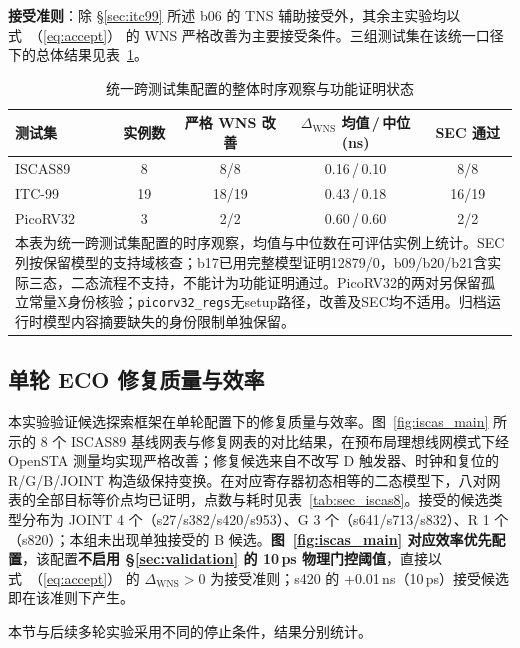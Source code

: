 \documentclass[twocolumn,10pt,fontset=windows]{ctexart}
\renewcommand{\eqref}[1]{\textup{（\ref{#1}）}}
\begin{document}
\textbf{接受准则}：除 \S\ref{sec:itc99} 所述 b06 的 TNS 辅助接受外，其余主实验均以式~\eqref{eq:accept} 的 WNS 严格改善为主要接受条件。三组测试集在该统一口径下的总体结果见表~\ref{tab:overview}。

\begin{table}[!htb]
\centering
\caption{统一跨测试集配置的整体时序观察与功能证明状态}
\label{tab:overview}
\scriptsize
\setlength{\tabcolsep}{3pt}
\begin{tabular}{lcccc}
\toprule
\textbf{测试集} & \textbf{实例数} & \textbf{严格 WNS 改善} & \textbf{$\Delta_{\mathrm{WNS}}$ 均值\,/\,中位 (ns)} & \textbf{SEC 通过} \\
\midrule
ISCAS89  & 8  & 8/8   & 0.16\,/\,0.10 & 8/8 \\
ITC-99   & 19 & 18/19 & 0.43\,/\,0.18 & 16/19 \\
PicoRV32 & 3  & 2/2   & 0.60\,/\,0.60 & 2/2 \\
\bottomrule
\multicolumn{5}{p{0.95\columnwidth}}{\footnotesize 本表为统一跨测试集配置的时序观察，均值与中位数在可评估实例上统计。SEC列按保留模型的支持域核查；b17已用完整模型证明12879/0，b09/b20/b21含实际三态，二态流程不支持，不能计为功能证明通过。PicoRV32的两对另保留孤立常量X身份核验；\texttt{picorv32\_regs}无setup路径，改善及SEC均不适用。归档运行时模型内容摘要缺失的身份限制单独保留。} \\
\end{tabular}
\end{table}

\subsection{单轮 ECO 修复质量与效率}\label{sec:iscas}

本实验验证候选探索框架在单轮配置下的修复质量与效率。图~\ref{fig:iscas_main} 所示的 8 个 ISCAS89 基线网表与修复网表的对比结果，在预布局理想线网模式下经 OpenSTA 测量均实现严格改善；修复候选来自不改写 D 触发器、时钟和复位的 R/G/B/JOINT 构造级保持变换。在对应寄存器初态相等的二态模型下，八对网表的全部目标等价点均已证明，点数与耗时见表~\ref{tab:sec_iscas8}。接受的候选类型分布为 JOINT 4 个（s27/s382/s420/s953）、G 3 个（s641/s713/s832）、R 1 个（s820）；本组未出现单独接受的 B 候选。\textbf{图~\ref{fig:iscas_main} 对应效率优先配置}\label{sec:eff_prio}，该配置\textbf{不启用 \S\ref{sec:validation} 的 10\,ps 物理门控阈值}，直接以式~\eqref{eq:accept} 的 $\Delta_{\mathrm{WNS}}>0$ 为接受准则；s420 的 +0.01\,ns（10\,ps）接受候选即在该准则下产生。

本节与后续多轮实验采用不同的停止条件，结果分别统计。
\end{document}
